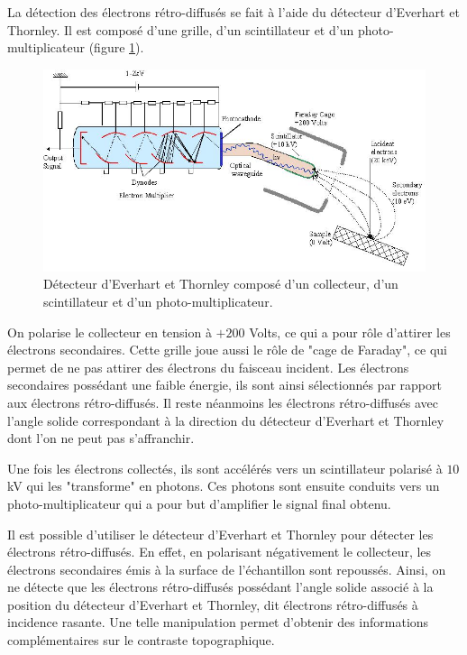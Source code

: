 \documentclass[a4paper,12pt]{article}
\newcommand\ett{Everhart et Thornley\xspace}
\begin{document}
La détection des électrons rétro-diffusés se fait à l'aide du détecteur d'\ett. Il est composé d'une grille, d'un scintillateur et d'un photo-multiplicateur (figure \ref{fig:detect_ett}).

\begin{figure}
\centering
\includegraphics[width = 0.9 \textwidth]{images/detect_ett.png}
\caption{Détecteur d'\ett composé d'un collecteur, d'un scintillateur et d'un photo-multiplicateur.}
\label{fig:detect_ett}
\end{figure}
 
On polarise le collecteur en tension à $+200$ Volts, ce qui a pour rôle d'attirer les électrons secondaires. 
Cette grille joue aussi le rôle de "cage de Faraday", ce qui permet de ne pas attirer des électrons du faisceau incident. 
Les électrons secondaires possédant une faible énergie, ils sont ainsi sélectionnés par rapport aux électrons rétro-diffusés.
Il reste néanmoins les électrons rétro-diffusés avec l'angle solide correspondant à la direction du détecteur d'\ett dont l'on ne peut pas s'affranchir. 

Une fois les électrons collectés, ils sont accélérés vers un scintillateur polarisé à $10$kV qui les "transforme" en photons.
Ces photons sont ensuite conduits vers un photo-multiplicateur qui a pour but d'amplifier le signal final obtenu.


Il est possible d'utiliser le détecteur d'\ett  pour détecter les électrons rétro-diffusés.
En effet, en polarisant négativement le collecteur, les électrons secondaires émis à la surface de l'échantillon sont repoussés.
Ainsi, on ne détecte que les électrons rétro-diffusés possédant l'angle solide associé à la position du détecteur d'\ett, dit électrons rétro-diffusés à incidence rasante.
Une telle manipulation permet d'obtenir des informations complémentaires sur le contraste topographique.
\end{document}
